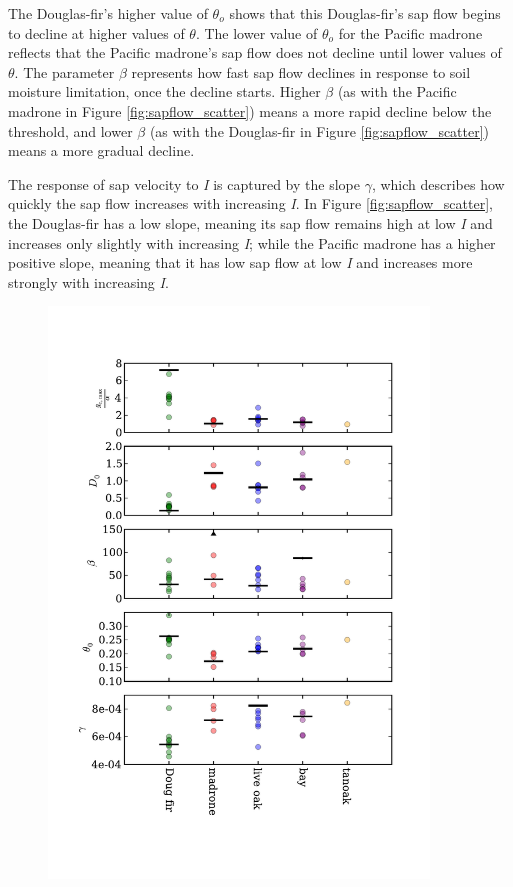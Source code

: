 The Douglas-fir's higher value of $\theta_o$ shows that this Douglas-fir's sap flow begins to decline at higher values of $\theta$.  The lower value of $\theta_o$ for the Pacific madrone reflects that the Pacific madrone's sap flow does not decline until lower values of $\theta$.  The parameter $\beta$ represents how fast sap flow declines in response to soil moisture limitation, once the decline starts.  Higher $\beta$ (as with the Pacific madrone in Figure \ref{fig:sapflow_scatter}) means a more rapid decline below the threshold, and lower $\beta$ (as with the Douglas-fir in Figure \ref{fig:sapflow_scatter}) means a more gradual decline.

The response of sap velocity to \textit{I} is captured by the slope $\gamma$, which describes how quickly the sap flow increases with increasing \textit{I}.  In Figure \ref{fig:sapflow_scatter}, the Douglas-fir has a low slope, meaning its sap flow remains high at low \textit{I} and increases only slightly with increasing \textit{I}; while the Pacific madrone has a higher positive slope, meaning that it has low sap flow at low \textit{I} and increases more strongly with increasing \textit{I}.

\begin{figure}[here]
\includegraphics[width=0.9\textwidth]{ch1-sapflow/figures/Figure07.pdf}
\caption{}
\label{fig:sapflow_params}
\end{figure}

